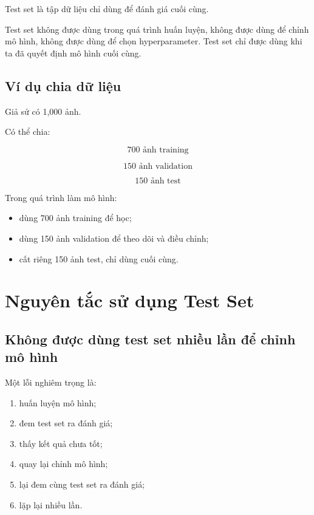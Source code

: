 \documentclass[12pt,a4paper]{report}
\begin{document}
Test set là tập dữ liệu chỉ dùng để đánh giá cuối cùng.

\begin{canhbao}
Test set không được dùng trong quá trình huấn luyện, không được dùng để chỉnh mô hình, không được dùng để chọn hyperparameter. Test set chỉ được dùng khi ta đã quyết định mô hình cuối cùng.
\end{canhbao}

\section{Ví dụ chia dữ liệu}

Giả sử có 1,000 ảnh.

Có thể chia:

\[
    700 \text{ ảnh training}
\]

\[
    150 \text{ ảnh validation}
\]

\[
    150 \text{ ảnh test}
\]

Trong quá trình làm mô hình:

\begin{itemize}
    \item dùng 700 ảnh training để học;
    \item dùng 150 ảnh validation để theo dõi và điều chỉnh;
    \item cất riêng 150 ảnh test, chỉ dùng cuối cùng.
\end{itemize}

\chapter{Nguyên tắc sử dụng Test Set}

\section{Không được dùng test set nhiều lần để chỉnh mô hình}

Một lỗi nghiêm trọng là:

\begin{enumerate}
    \item huấn luyện mô hình;
    \item đem test set ra đánh giá;
    \item thấy kết quả chưa tốt;
    \item quay lại chỉnh mô hình;
    \item lại đem cùng test set ra đánh giá;
    \item lặp lại nhiều lần.
\end{enumerate}
\end{document}
